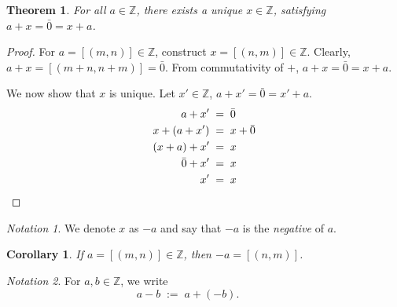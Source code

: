 \documentclass[10pt]{article}
\newtheorem{theorem}{Theorem}[section]
\newtheorem{corollary}{Corollary}[theorem]
\theoremstyle{definition}
\theoremstyle{remark}
\newtheorem*{notation}{Notation}
\newcommand{\Z}{\mathbb{Z}}
\begin{document}
        \begin{theorem}
                        For all $a \in \Z$, there exists a unique $x \in \Z$, satisfying $a + x = \bar{0} = x + a$.
        \end{theorem}
        \begin{proof}
                For $a = [(m, n)] \in \Z$, construct $x = [(n, m)] \in \Z$.
                Clearly, $a + x = [(m + n, n + m)] = \bar{0}$.
                From commutativity of $+$, $a + x = \bar{0} = x + a$.

                We now show that $x$ is unique. Let $x' \in \Z$, $a + x' = \bar{0} = x' + a$.
                \begin{align*}
                        a + x' \;&=\; \bar{0} \\
                        x + (a + x') \;&=\; x + \bar{0} \\
                        (x + a) + x' \;&=\; x \\
                        \bar{0} + x' \;&=\; x \\
                        x' \;&=\; x     \qedhere
                \end{align*}
        \end{proof}
        \begin{notation}
                We denote $x$ as $-a$ and say that $-a$ is the \textit{negative} of $a$.
        \end{notation}
        \begin{corollary}
                If $a = [(m, n)] \in \Z$, then $-a = [(n, m)]$.
        \end{corollary}
        \begin{notation}
                For $a, b \in \Z$, we write
                \[
                a - b \;:=\; a + (-b).\quad\quad\quad
                \]
        \end{notation}
\end{document}
